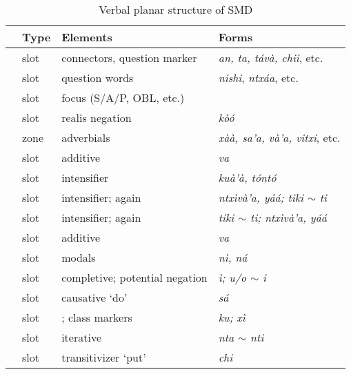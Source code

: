 \documentclass[output=paper]{langscibook}
\begin{document}
\begin{table}
    \caption{Verbal planar structure of SMD}
    \label{tab:template}
    \begin{tabular}{Slll} 
    \lsptoprule
        & Type  & Elements  & Forms \\ \midrule
\label{con}                & slot          & connectors, question marker                   & \textit{an, ta, távà, chii}, etc. \\
\label{interrog}           & slot          & question words             & \textit{nishi}, \textit{ntxáa}, etc. \\
\label{foc}                & slot          & focus (S/A/P, OBL, etc.)           & \textit{}                  \\
\label{rneg}               & slot          & realis negation              & \textit{kòó}             \\
\label{advpre}                & zone          & adverbials                   & \textit{xàà, sa'a, và'a, vitxi}, etc. \\
\label{addpre1}               & slot          & additive                     & \textit{va}    \\ 
\label{intpre1}               & slot          & intensifier     & \textit{kuà'à, tóntó} \\
\label{intpre2}               & slot          & intensifier; again    & \textit{ntxìvà'a, yáá; tiki $\sim$ ti} \\
\label{reppre1}              & slot          & intensifier; again     & \textit{tiki $\sim$ ti; ntxìvà'a, yáá}   \\
\label{addpre2}              & slot          & additive                     & \textit{va}    \\
\label{mod}               & slot          & modals             & \textit{nì, ná}     \\
\label{irrneg}             & slot          & completive; potential negation            & \textit{ì; u/o $\sim$ i}          \\
\label{do}                 & slot          & causative `do’               & \textit{sá}               \\
\label{class}               & slot          & \Pot{}; \Cmpl{} class markers         & \textit{ku; xì}              \\
\label{iter}               & slot          & iterative                    & \textit{nta $\sim$ nti}      \\
\label{put}                & slot          & transitivizer `put’              & \textit{chi}               \\

\end{tabular}
\end{table}
\end{document}
